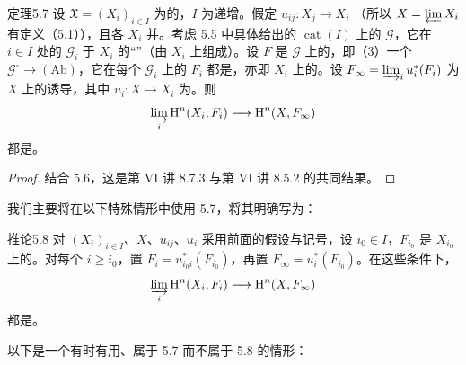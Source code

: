 \begin{SGAresult}{定理}{5.7}
设 $\mathfrak X=(X_i)_{i\in I}$ 为的，$I$ 为递增。假定 $u_{ij}:X_j\to X_i$ （所以 $X=\varprojlim X_i$ 有定义（5.1）），且各 $X_i$ 并。考虑 5.5 中具体给出的 $\operatorname{cat}(I)$ 上的 $\mathscr G$，它在 $i\in I$ 处的 $\mathscr G_i$ 于 $X_i$ 的“”（由 $X_i$ 上组成）。设 $F$ 是 $\mathscr G$ 上的，即（3）一个 $\mathscr G^\circ\to(\mathrm{Ab})$，它在每个 $\mathscr G_i$ 上的 $F_i$ 都是，亦即 $X_i$ 上的。设 $F_\infty=\varinjlim_i u_i^*(F_i)$ 为 $X$ 上的诱导，其中 $u_i:X\to X_i$ 为。则
\[
 \varinjlim_i\mathrm H^n(X_i,F_i)\longrightarrow\mathrm H^n(X,F_\infty)
\]
都是。
\end{SGAresult}
\begin{proof}
结合 5.6，这是第 VI 讲 8.7.3 与第 VI 讲 8.5.2 的共同结果。
\end{proof}
我们主要将在以下特殊情形中使用 5.7，将其明确写为：

\begin{SGAresult}{推论}{5.8}
对 $(X_i)_{i\in I}$、$X$、$u_{ij}$、$u_i$ 采用前面的假设与记号，设 $i_0\in I$，$F_{i_0}$ 是 $X_{i_0}$ 上的。对每个 $i\geq i_0$，置 $F_i=u_{i_0i}^*(F_{i_0})$，再置 $F_\infty=u_i^*(F_{i_0})$。在这些条件下，
\[
 \varinjlim_i\mathrm H^n(X_i,F_i)\longrightarrow\mathrm H^n(X,F_\infty)
\]
都是。
\end{SGAresult}
以下是一个有时有用、属于 5.7 而不属于 5.8 的情形：

